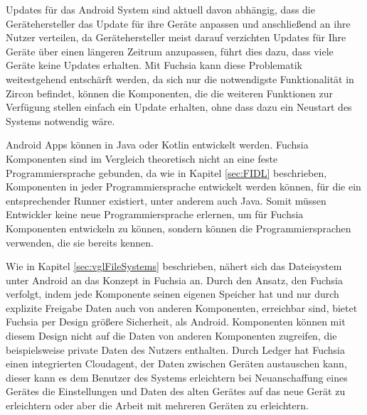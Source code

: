 \documentclass[a4paper]{scrartcl}
\begin{document}
Updates für das Android System sind aktuell davon abhängig, dass die Gerätehersteller das Update für ihre Geräte anpassen und anschließend an ihre Nutzer verteilen, da Gerätehersteller 
meist darauf verzichten Updates für Ihre Geräte über einen längeren Zeitrum anzupassen, führt dies dazu, dass viele Geräte keine Updates erhalten. Mit Fuchsia kann diese Problematik weitestgehend entschärft werden, da sich nur die notwendigste Funktionalität in Zircon befindet, können die Komponenten, die die weiteren Funktionen zur Verfügung stellen einfach ein Update erhalten, ohne dass dazu ein Neustart des Systems notwendig wäre.

Android Apps können in Java oder Kotlin entwickelt werden. Fuchsia Komponenten sind im Vergleich theoretisch nicht an eine feste Programmiersprache gebunden, da wie in Kapitel \ref{sec:FIDL} beschrieben, Komponenten in jeder Programmiersprache entwickelt werden können, für die ein entsprechender Runner existiert, unter anderem auch Java. Somit müssen Entwickler keine neue Programmiersprache erlernen, um für Fuchsia Komponenten entwickeln zu können, sondern können die Programmiersprachen verwenden, die sie bereits kennen.



Wie in Kapitel \ref{sec:vglFileSystems} beschrieben, nähert sich das Dateisystem unter Android an das Konzept in Fuchsia an. Durch den Ansatz, den Fuchsia verfolgt, indem jede Komponente seinen eigenen Speicher hat und nur durch explizite Freigabe Daten auch von anderen Komponenten, erreichbar sind, bietet Fuchsia per Design größere Sicherheit, als Android. Komponenten können mit diesem Design nicht auf die Daten von anderen Komponenten zugreifen, die beispielsweise private Daten des Nutzers enthalten. Durch Ledger hat Fuchsia einen integrierten Cloudagent, der Daten zwischen Geräten austauschen kann, dieser kann es dem Benutzer des Systems erleichtern bei Neuanschaffung eines Gerätes die Einstellungen und Daten des alten Gerätes auf das neue Gerät zu erleichtern oder aber die Arbeit mit mehreren Geräten zu erleichtern.




\end{document}
